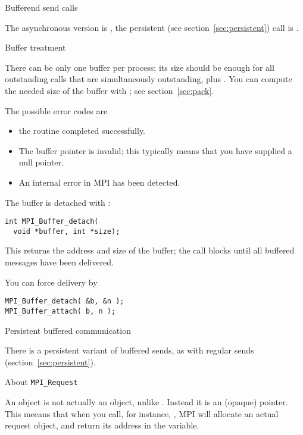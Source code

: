  {Bufferend send calls}


The asynchronous version is , the persistent
(see section~\ref{sec:persistent}) call is .

 {Buffer treatment}

There can be only one buffer per process; its size should be enough
for all outstanding  calls that are simultaneously
outstanding, plus .
You can compute the needed size of the buffer with ;
see section~\ref{sec:pack}.


The possible error codes are
\begin{itemize}
\item {} the routine completed successfully.
\item {} The buffer pointer is invalid;
  this typically means that you have supplied a null pointer.
\item {} An internal error in MPI has been detected.
\end{itemize}

The buffer is detached with :
\begin{lstlisting}
int MPI_Buffer_detach(
  void *buffer, int *size);
\end{lstlisting}
This returns the address and size of the buffer; the call blocks
until all buffered messages have been delivered.

You can force delivery by
\begin{lstlisting}
MPI_Buffer_detach( &b, &n );
MPI_Buffer_attach( b, n );
\end{lstlisting}

 {Persistent buffered communication}

There is a persistent variant of buffered sends, as with regular
sends (section~\ref{sec:persistent}).


 {About \texttt{MPI\_Request}}
\label{ref:mpirequest}

An  object is not actually an object,
unlike . Instead it is an (opaque) pointer.
This meeans that when you call, for instance, ,
MPI will allocate an actual request object, and return its
address in the  variable.

